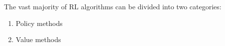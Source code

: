 \documentclass{../main.tex}{subfiles}
\begin{document}
The vast majority of RL algorithms \citep{Sutton1998} can be divided into two categories:

\begin{enumerate}
\item Policy methods
\item Value methods
\end{enumerate}
\end{document}
